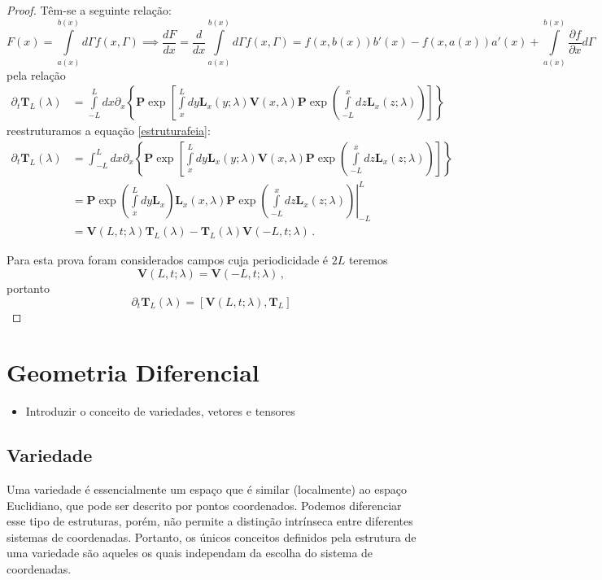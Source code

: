 \documentclass[25pt]{article}
\numberwithin{equation}{subsection} %
\newcommand{\commutador}[2]{\left[#1,#2\right]}
\newcommand{\OP}[1]{\mathbf{#1}}
\newcommand{\Pd}[1]{\partial_{#1}}
\newcommand{\pd}[2]{\frac{\partial #1}{\partial #2}}
\begin{document}
\begin{proof}
Têm-se a seguinte relação:
\begin{equation}
F(x)=\int\limits_{a(x)}^{b(x)}d\Gamma f(x,\Gamma)\implies \frac{dF}{dx}=\frac{d}{dx}\int\limits_{a(x)}^{b(x)}d\Gamma f(x,\Gamma)=f(x,b(x))b'(x)-f(x,a(x))a'(x)+\int\limits_{a(x)}^{b(x)}\pd{f}{x}d\Gamma
\end{equation}
pela relação
\begin{align}
\Pd{t}\OP{T}_{L}(\lambda)&=\int\limits_{-L}^{L}dx\Pd{x}\left\{\OP{P}\exp\left[\int\limits_{x}^{L}dy\OP{L}_{x}(y;\lambda)\OP{V}(x,\lambda)\OP{P}\exp\left(\int\limits_{-L}^{x}dz\OP{L}_{x}(z;\lambda)\right)\right]\right\}
\end{align}
reestruturamos a equação \ref{estruturafeia}:
\begin{align}
\Pd{t}\OP{T}_{L}(\lambda)&=\int_{-L}^{L}dx\Pd{x}\left\{\OP{P}\exp\left[\int\limits_{x}^{L}dy\OP{L}_{x}(y;\lambda)\OP{V}(x,\lambda)\OP{P}\exp\left(\int\limits_{-L}^{x}dz\OP{L}_{x}(z;\lambda)\right)\right]\right\}\\
&=\left.\OP{P}\exp\left(\int\limits_{x}^{L}dy\OP{L}_{x}\right)\OP{L}_{x}(x,\lambda)\OP{P}\exp\left(\int\limits_{-L}^{x}dz\OP{L}_{x}\left(z;\lambda\right)\right)\right|_{-L}^{L}\\
&=\OP{V}(L,t;\lambda)\OP{T}_{L}(\lambda)-\OP{T}_{L}(\lambda)\OP{V}(-L,t;\lambda)\,.
\end{align}

Para esta prova foram considerados campos cuja periodicidade é $2L$ teremos
\begin{displaymath}
\OP{V}(L,t;\lambda)=\OP{V}(-L,t;\lambda)\,,
\end{displaymath}
portanto
\begin{equation}
\Pd{t}\OP{T}_{L}(\lambda)=\commutador{\OP{V}(L,t;\lambda)}{\OP{T}_{L}}
\end{equation}
\end{proof}
\pagebreak


\pagebreak

\section{Geometria Diferencial}
\begin{itemize}
	\item Introduzir o conceito de variedades, vetores e tensores
\end{itemize}
\subsection{Variedade}
Uma variedade é essencialmente um espaço que é similar (localmente) ao espaço Euclidiano, que pode ser descrito por pontos coordenados. Podemos diferenciar esse tipo de estruturas, porém, não permite a distinção intrínseca entre diferentes sistemas de coordenadas. Portanto, os únicos conceitos definidos pela estrutura de uma variedade são aqueles os quais independam da escolha do sistema de coordenadas.
\bigbreak
\end{document}
